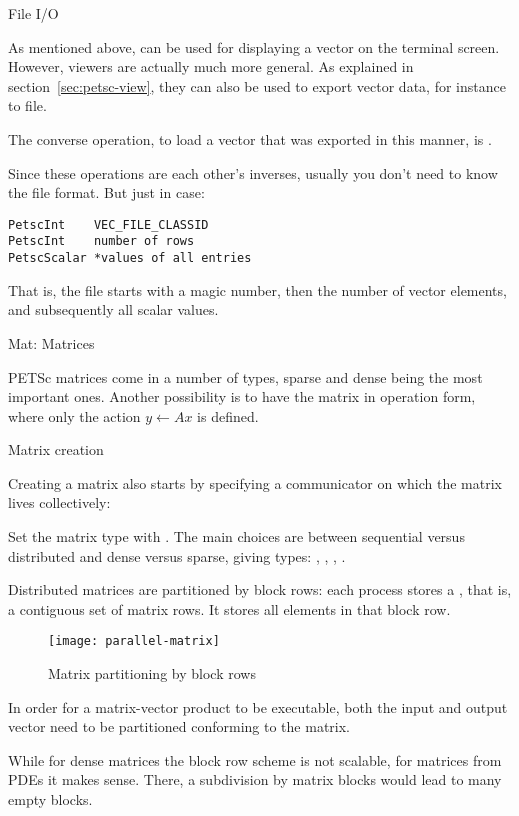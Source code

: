  {File I/O}
\label{sec:vecviewload}

As mentioned above,  can be used for
displaying a vector on the terminal screen.
However, viewers are actually much more general.
As explained in section~\ref{sec:petsc-view},
they can also be used to export vector data, for instance to file.

The converse operation, to load a vector that was exported in this manner,
is .

Since these operations are each other's inverses,
usually you don't need to know the file format.
But just in case:
\begin{lstlisting}
PetscInt    VEC_FILE_CLASSID
PetscInt    number of rows
PetscScalar *values of all entries
\end{lstlisting}
That is, the file starts with a magic number, then the number of vector elements,
and subsequently all scalar values.

 {Mat: Matrices}

PETSc matrices come in a number of types, sparse and dense being the
most important ones. Another possibility is to have the matrix in
operation form, where only the action $y\leftarrow Ax$ is defined.

 {Matrix creation}
\label{sec:petscmat-create}

Creating a matrix also starts by specifying a communicator on which
the matrix lives collectively:
%

Set the matrix type with .  The main choices
are between sequential versus distributed and dense versus sparse,
giving types: , ,
, .

Distributed matrices are partitioned by block rows: each process
stores a , that is, a contiguous set of matrix
rows. It stores all elements in that block row.
%
\begin{figure}[ht]
  \texttt{[image: parallel-matrix]}
  \caption{Matrix partitioning by block rows}
  \label{fig:parallel-matrix}
\end{figure}
%
In order for a matrix-vector product to be executable, both the input
and output vector need to be partitioned conforming to the matrix.

While for dense matrices the block row scheme is not scalable, for
matrices from \acp{PDE} it makes sense. There, a subdivision by matrix
blocks would lead to many empty blocks.

